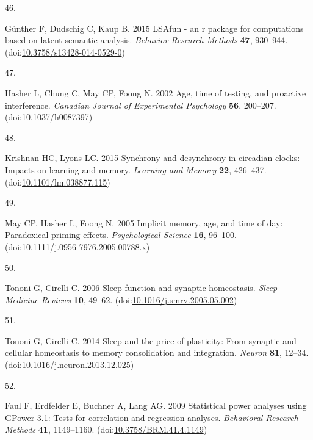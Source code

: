 \documentclass[
]{article}
\newlength{\cslhangindent}
\newlength{\csllabelwidth}
\newlength{\cslentryspacingunit} %
\newenvironment{CSLReferences}[2] %
 {%
  \setlength{\parindent}{0pt}
  \ifodd #1
  \let\oldpar\par
  \def\par{\hangindent=\cslhangindent\oldpar}
  \fi
  \setlength{\parskip}{#2\cslentryspacingunit}
 }%
 {}
\newcommand{\CSLLeftMargin}[1]{\parbox[t]{\csllabelwidth}{#1}}
\newcommand{\CSLRightInline}[1]{\parbox[t]{\linewidth - \csllabelwidth}{#1}\break}
\begin{document}
\begin{CSLReferences}{0}{0}
\leavevmode{}%
\CSLLeftMargin{46. }%
\CSLRightInline{Günther F, Dudschig C, Kaup B. 2015 LSAfun - an r package for computations based on latent semantic analysis. \emph{Behavior Research Methods} \textbf{47}, 930--944. (doi:\href{https://doi.org/10.3758/s13428-014-0529-0}{10.3758/s13428-014-0529-0})}

\leavevmode{}%
\CSLLeftMargin{47. }%
\CSLRightInline{Hasher L, Chung C, May CP, Foong N. 2002 Age, time of testing, and proactive interference. \emph{Canadian Journal of Experimental Psychology} \textbf{56}, 200--207. (doi:\href{https://doi.org/10.1037/h0087397}{10.1037/h0087397})}

\leavevmode{}%
\CSLLeftMargin{48. }%
\CSLRightInline{Krishnan HC, Lyons LC. 2015 Synchrony and desynchrony in circadian clocks: Impacts on learning and memory. \emph{Learning and Memory} \textbf{22}, 426--437. (doi:\href{https://doi.org/10.1101/lm.038877.115}{10.1101/lm.038877.115})}

\leavevmode{}%
\CSLLeftMargin{49. }%
\CSLRightInline{May CP, Hasher L, Foong N. 2005 Implicit memory, age, and time of day: Paradoxical priming effects. \emph{Psychological Science} \textbf{16}, 96--100. (doi:\href{https://doi.org/10.1111/j.0956-7976.2005.00788.x}{10.1111/j.0956-7976.2005.00788.x})}

\leavevmode{}%
\CSLLeftMargin{50. }%
\CSLRightInline{Tononi G, Cirelli C. 2006 Sleep function and synaptic homeostasis. \emph{Sleep Medicine Reviews} \textbf{10}, 49--62. (doi:\href{https://doi.org/10.1016/j.smrv.2005.05.002}{10.1016/j.smrv.2005.05.002})}

\leavevmode{}%
\CSLLeftMargin{51. }%
\CSLRightInline{Tononi G, Cirelli C. 2014 Sleep and the price of plasticity: From synaptic and cellular homeostasis to memory consolidation and integration. \emph{Neuron} \textbf{81}, 12--34. (doi:\href{https://doi.org/10.1016/j.neuron.2013.12.025}{10.1016/j.neuron.2013.12.025})}

\leavevmode{}%
\CSLLeftMargin{52. }%
\CSLRightInline{Faul F, Erdfelder E, Buchner A, Lang AG. 2009 Statistical power analyses using GPower 3.1: Tests for correlation and regression analyses. \emph{Behavioral Research Methods} \textbf{41}, 1149--1160. (doi:\href{https://doi.org/10.3758/BRM.41.4.1149}{10.3758/BRM.41.4.1149})}


\end{CSLReferences}
\end{document}
